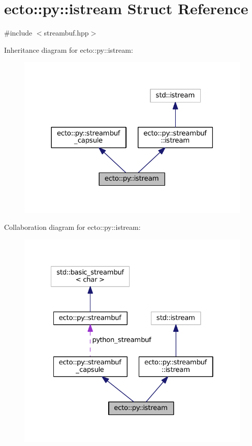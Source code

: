 \hypertarget{structecto_1_1py_1_1istream}{}\section{ecto\+:\+:py\+:\+:istream Struct Reference}
\label{structecto_1_1py_1_1istream}


{\ttfamily \#include $<$streambuf.\+hpp$>$}



Inheritance diagram for ecto\+:\+:py\+:\+:istream\+:\nopagebreak
\begin{figure}[H]
\begin{center}
\leavevmode
\includegraphics[width=318pt]{structecto_1_1py_1_1istream__inherit__graph}
\end{center}
\end{figure}


Collaboration diagram for ecto\+:\+:py\+:\+:istream\+:\nopagebreak
\begin{figure}[H]
\begin{center}
\leavevmode
\includegraphics[width=322pt]{structecto_1_1py_1_1istream__coll__graph}
\end{center}
\end{figure}
